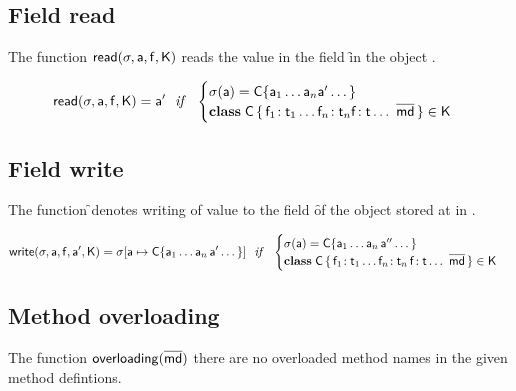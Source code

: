 \documentclass[a4paper,USenglish]{tex/lipics-v2016}
\begin{document}
\subsection{Field read}

The function $\readf\s\a\f\K$ reads the value in the field \f in the object \a.

\begin{equation*}
\readf \s\a\f\K = \ap 
  ~~\mathit{if}~~ \begin{cases}  \s(\a) = \obj\C{\a_1\dots\a_n \ap \dots}\\
 \Class\C {\Fdef{\f_1}{\t_1}\dots\Fdef{\f_n}{\t_n}\Ftype\f\t\dots}{\b\md}\in\K
 \end{cases}
\end{equation*}

\subsection{Field write}

The function \setf\s\a\f\ap\K denotes writing of value \ap to the field \f of
the object stored at \a in \s.

\begin{equation*}
\setf \s\a\f\ap\K= \Map\s{\Bind{\a}{\obj\C{\a_1\dots\a_n\,\ap\dots}}}
  ~~\mathit{if}~~ \begin{cases}
   \s(\a) = \obj\C{\a_1\dots\a_n\,\app\dots}\\
   \Class\C{\Fdef{\f_1}{\t_1}\dots\Fdef{\f_n}{\t_n}\,\Fdef\f\t\dots}{\b\md}\in\K
\end{cases}
\end{equation*}

\subsection{Method overloading}

The function $\xt{overloading}(\b\md)$ there are no overloaded method names in the
given method defintions.


\begin{mathpar}



\end{mathpar}
\end{document}
